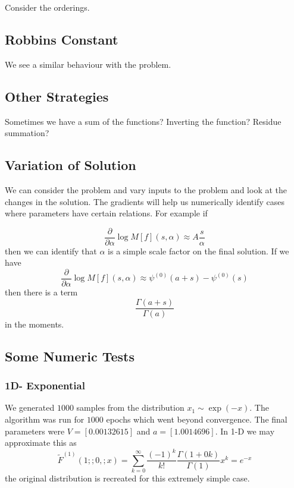 \documentclass{article}
\begin{document}
Consider the orderings.

\subsection{Robbins Constant}
We see a similar behaviour with the problem.

\subsection{Other Strategies}
Sometimes we have a sum of the functions?
Inverting the function? Residue summation?

\subsection{Variation of Solution}
We can consider the problem and vary inputs to the problem and look at the changes in the solution. The gradients will help us numerically identify cases where parameters have certain relations. For example if 

\begin{equation}
\frac{\partial}{\partial \alpha} \log M[f](s,\alpha) \approx A\frac{s}{\alpha}
\end{equation}
then we can identify that $\alpha$ is a simple scale factor on the final solution. If we have \begin{equation}
\frac{\partial}{\partial \alpha} \log M[f](s,\alpha) \approx \psi^{(0)}(a+s) - \psi^{(0)}(s)
\end{equation}
then there is a term 
\begin{equation}
\frac{\Gamma(a+s)}{\Gamma(a)}
\end{equation}
in the moments.

\subsection{Some Numeric Tests}
\subsubsection{1D- Exponential}
We generated $1000$ samples from the distribution $x_1 \sim \exp(-x)$. The algorithm was run for $1000$ epochs which went beyond convergence. The final parameters were $V = [0.00132615]$ and $a=[1.0014696]$. In 1-D we may approximate this as \begin{equation}
\tilde{F}^{(1)}(1;;0,;x) = \sum_{k=0}^\infty \frac{(-1)^k}{k!} \frac{\Gamma(1+0k)}{\Gamma(1)} x^k = e^{-x}
\end{equation}
the original distribution is recreated for this extremely simple case.
\end{document}
